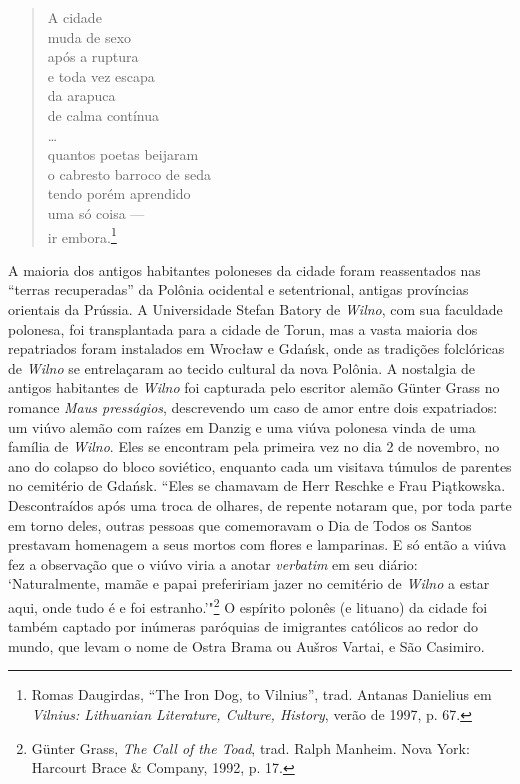\begin{verse}
A cidade\\
muda de sexo\\
após a ruptura\\
e toda vez escapa\\
da arapuca\\
de calma contínua\\
\ldots{}\\
quantos poetas beijaram\\
o cabresto barroco de seda\\
tendo porém aprendido\\
uma só coisa ---\\
ir embora.\footnote{Romas Daugirdas, ``The Iron Dog, to Vilnius'', trad. Antanas Danielius em \textit{Vilnius: Lithuanian Literature, Culture, History}, verão de 1997, p. 67.} 
\end{verse}

A maioria dos antigos habitantes poloneses da cidade foram reassentados
nas ``terras recuperadas'' da Polônia ocidental e setentrional, antigas
províncias orientais da Prússia. A Universidade Stefan Batory de \textit{Wilno},
com sua faculdade polonesa, foi transplantada para a cidade de Torun,
mas a vasta maioria dos repatriados foram instalados em Wrocław e
Gdańsk, onde as tradições folclóricas de \textit{Wilno} se entrelaçaram ao tecido
cultural da nova Polônia. A nostalgia de antigos habitantes de \textit{Wilno} foi
capturada pelo escritor alemão Günter Grass no romance \textit{Maus
presságios}, descrevendo um caso de amor entre dois expatriados: um
viúvo alemão com raízes em Danzig e uma viúva polonesa vinda de uma
família de \textit{Wilno}. Eles se encontram pela primeira vez no dia 2 de
novembro, no ano do colapso do bloco soviético, enquanto cada um
visitava túmulos de parentes no cemitério de Gdańsk. ``Eles se chamavam
de Herr Reschke e Frau Piątkowska. Descontraídos após uma troca de
olhares, de repente notaram que, por toda parte em torno deles, outras
pessoas que comemoravam o Dia de Todos os Santos prestavam homenagem a
seus mortos com flores e lamparinas. E só então a viúva fez a observação
que o viúvo viria a anotar \textit{verbatim} em seu diário: `Naturalmente,
mamãe e papai prefeririam jazer no cemitério de \textit{Wilno} a estar aqui, onde
tudo é e foi estranho.'"\footnote{Günter Grass, \textit{The Call of the Toad}, trad. Ralph Manheim. Nova York: Harcourt Brace \& Company, 1992, p. 17.} O espírito polonês (e lituano) da cidade foi também captado por inúmeras paróquias de imigrantes católicos ao redor do mundo, que
levam o nome de Ostra Brama ou Aušros Vartai, e São Casimiro.

